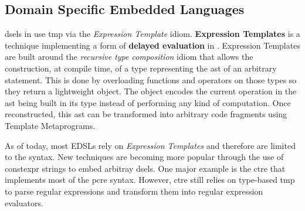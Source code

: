 \documentclass[../main]{subfiles}
\begin{document}
%



\subsection{
  \cpp Domain Specific Embedded Languages
}

\glspl{dsel} in \cpp use \gls{tmp} via the \textit{Expression
Template} idiom.
\textbf{Expression Templates} \cite{veldhuizen:1995,vandevoorde:2002} is a
technique implementing a form of \textbf{delayed evaluation} in
\cpp \cite{spinellis:2001}. Expression Templates are built around the
\textit{recursive type composition} idiom \cite{jarvi:1998} that allows the
construction, at compile time, of a type representing the \gls{ast}
of an arbitrary statement. This is done by overloading functions and operators
on those types so they return a lightweight object.
The object encodes the current operation in the \gls{ast}
being built in its type instead of performing any kind of computation.
Once reconstructed, this \gls{ast} can be transformed into arbitrary code fragments
using Template Metaprograms.

As of today, most \cpp EDSLs rely on \textit{Expression Templates} and therefore
are limited to the \cpp syntax. New techniques are becoming more popular through
the use of \gls{constexpr} strings to embed arbitray
\glspl{dsel}. One major example is the \gls{ctre} \cite{ctre}
that implements most of the \gls{pcre} syntax.
However, \gls{ctre} still relies on type-based \gls{tmp} to parse
regular expressions and transform them into regular expression evaluators.


\end{document}

